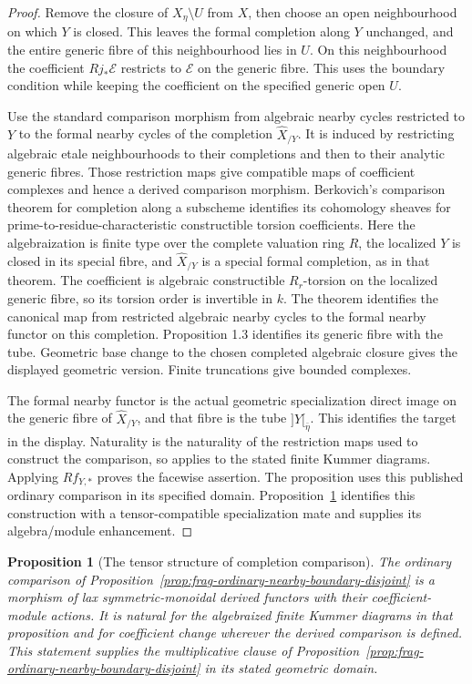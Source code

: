 \documentclass[11pt]{article}
\newtheorem{proposition}[theorem]{Proposition}
\theoremstyle{definition}
\theoremstyle{remark}
\begin{document}
\begin{proof}
Remove the closure of $X_\eta\setminus U$ from $X$, then choose an
open neighbourhood on which $Y$ is closed.  This leaves the formal
completion along $Y$ unchanged, and the entire generic fibre of this
neighbourhood lies in $U$.  On this neighbourhood the coefficient
$Rj_*\mathcal E$ restricts to $\mathcal E$ on the generic fibre.
This uses the boundary condition while keeping the coefficient
on the specified generic open $U$.

Use the standard comparison morphism from algebraic nearby cycles
restricted to $Y$ to the formal nearby cycles of the completion
$\widehat X_{/Y}$.  It is induced by restricting algebraic etale
neighbourhoods to their completions and then to their analytic
generic fibres.  Those restriction maps give compatible maps of
coefficient complexes and hence a derived comparison morphism.
Berkovich's comparison theorem for completion along a subscheme
\cite[Theorem 3.1]{BerkovichFormalII} identifies its cohomology
sheaves for prime-to-residue-characteristic constructible torsion
coefficients.  Here the algebraization is finite type over the complete valuation
ring $R$, the localized $Y$ is closed in its special fibre, and
$\widehat X_{/Y}$ is a special formal completion, as in that theorem.
The coefficient is algebraic constructible $R_r$-torsion on the
localized generic fibre, so its torsion order is invertible in $k$.
The theorem identifies the canonical map from restricted algebraic
nearby cycles to the formal nearby functor on this completion.
Proposition 1.3 identifies its generic fibre with the tube.  Geometric base change
to the chosen completed algebraic closure gives the displayed
geometric version.  Finite truncations give bounded complexes.

The formal nearby functor is the actual geometric specialization
direct image on the generic fibre of $\widehat X_{/Y}$, and that
fibre is the tube $]Y[_{\bar\eta}$.  This identifies the target in
the display.  Naturality is the naturality of the restriction maps
used to construct the comparison, so applies to the stated finite
Kummer diagrams.  Applying $Rf_{Y,*}$ proves the facewise assertion.
The proposition uses this published ordinary comparison in its
specified domain.  Proposition~\ref{prop:frag-completion-comparison-monoidal}
identifies this construction with a tensor-compatible specialization
mate and supplies its algebra/module enhancement.
\end{proof}

\begin{proposition}[The tensor structure of completion comparison]
\label{prop:frag-completion-comparison-monoidal}
The ordinary comparison of
Proposition~\ref{prop:frag-ordinary-nearby-boundary-disjoint} is a
morphism of lax symmetric-monoidal derived functors with their
coefficient-module actions.  It is natural for the algebraized finite
Kummer diagrams in that proposition and for coefficient change wherever
the derived comparison is defined.  This statement supplies the
multiplicative clause of Proposition~\ref{prop:frag-ordinary-nearby-boundary-disjoint} in its stated geometric domain.
\end{proposition}
\end{document}
